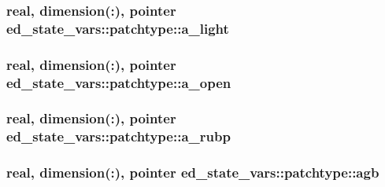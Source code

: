 \subsubsection[{\texorpdfstring{a\+\_\+light}{a_light}}]{\setlength{\rightskip}{0pt plus 5cm}real, dimension(\+:), pointer ed\+\_\+state\+\_\+vars\+::patchtype\+::a\+\_\+light}\hypertarget{structed__state__vars_1_1patchtype_a672b64dadd4e7421d56daf7133a818b7}{}\label{structed__state__vars_1_1patchtype_a672b64dadd4e7421d56daf7133a818b7}
\subsubsection[{\texorpdfstring{a\+\_\+open}{a_open}}]{\setlength{\rightskip}{0pt plus 5cm}real, dimension(\+:), pointer ed\+\_\+state\+\_\+vars\+::patchtype\+::a\+\_\+open}\hypertarget{structed__state__vars_1_1patchtype_ad711f51f421bb361f95f288c0740e3f5}{}\label{structed__state__vars_1_1patchtype_ad711f51f421bb361f95f288c0740e3f5}
\subsubsection[{\texorpdfstring{a\+\_\+rubp}{a_rubp}}]{\setlength{\rightskip}{0pt plus 5cm}real, dimension(\+:), pointer ed\+\_\+state\+\_\+vars\+::patchtype\+::a\+\_\+rubp}\hypertarget{structed__state__vars_1_1patchtype_a2db59596c8dd4b7de8367a0533bfdde6}{}\label{structed__state__vars_1_1patchtype_a2db59596c8dd4b7de8367a0533bfdde6}
\subsubsection[{\texorpdfstring{agb}{agb}}]{\setlength{\rightskip}{0pt plus 5cm}real, dimension(\+:), pointer ed\+\_\+state\+\_\+vars\+::patchtype\+::agb}\hypertarget{structed__state__vars_1_1patchtype_af3f27c5fef0cf39fab0aa923e1482f41}{}\label{structed__state__vars_1_1patchtype_af3f27c5fef0cf39fab0aa923e1482f41}
